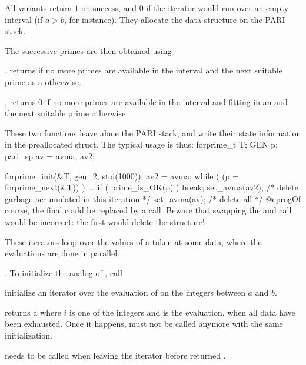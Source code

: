 All variants return $1$ on success, and $0$ if the iterator would run over an
empty interval (if $a > b$, for instance). They allocate the 
data structure on the PARI stack.

\noindent The successive primes are then obtained using

, returns  if no more primes
are available in the interval and the next suitable prime as a 
otherwise.

, returns $0$ if no more primes
are available in the interval and fitting in an  and the next
suitable prime otherwise.

These two functions leave alone the PARI stack, and write their state
information in the preallocated  struct. The typical usage is
thus:
\bprog
  forprime_t T;
  GEN p;
  pari_sp av = avma, av2;

  forprime_init(&T, gen_2, stoi(1000));
  av2 = avma;
  while ( (p = forprime_next(&T)) )
  {
    ...
    if ( prime_is_OK(p) ) break;
    set_avma(av2); /* delete garbage accumulated in this iteration */
  }
  set_avma(av); /* delete all */
@eprog\noindent Of course, the final  could be replaced
by a  call. Beware that swapping the
 and  call would be incorrect: the
first  would delete the  structure!


These iterators loop over the values of a  taken at some data,
where the evaluations are done in parallel.

\item {}. To initialize the analog of
, call

initialize an iterator over the evaluation of  on the integers
between $a$ and $b$.

 returns a  \kbd{[i,code(i)]} where
$i$ is one of the integers and  is the evaluation,  when
all data have been exhausted. Once it happens,  must not be
called anymore with the same initialization.

 needs to be called when leaving the
iterator before  returned .

